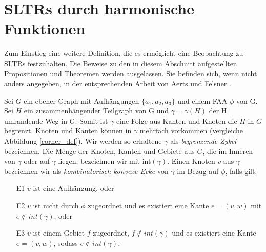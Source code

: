 \section{SLTRs durch harmonische Funktionen}\label{harmonic_approach}

Zum Einstieg eine weitere Definition, die es ermöglicht eine Beobachtung zu SLTRs festzuhalten. Die Beweise zu den in diesem Abschnitt aufgestellten Propositionen und Theoremen werden ausgelassen. Sie befinden sich, wenn nicht anders angegeben, in der entsprechenden Arbeit von Aerts und Felsner \cite{af13}.

\begin{definition}\label{def_ccc}
Sei $G$ ein ebener Graph mit Aufhängungen $\{a_1,a_2,a_3\}$ und einem FAA $\phi$ von G. Sei $H$ ein zusammenhängender Teilgraph von G und $\gamma=\gamma(H)$ der H umrandende Weg in G. Somit ist $\gamma$ eine Folge aus Kanten und Knoten die $H$ in $G$ begrenzt. Knoten und Kanten können in $\gamma$ mehrfach vorkommen (vergleiche Abbildung \ref{corner_def}). Wir werden so erhaltene $\gamma$ als \textit{begrenzende Zykel} bezeichnen. Die Menge der Knoten, Kanten und Gebiete aus $G$, die im Inneren von $\gamma$ oder auf $\gamma$ liegen, bezeichnen wir mit int$(\gamma)$. Einen Knoten $v$ aus $\gamma$ bezeichnen wir als \textit{kombinatorisch konvexe Ecke} von $\gamma$ im Bezug auf $\phi$, falls gilt:
\begin{itemize}
\item [E1] $v$ ist eine Aufhängung, oder
\item [E2] $v$ ist nicht durch $\phi$ zugeordnet und es existiert eine Kante $e = (v,w)$ mit $e \notin int(\gamma)$, oder
\item [E3] $v$ ist einem Gebiet $f$ zugeordnet, $f \notin int(\gamma)$ und es existiert eine Kante $e = (v,w)$, sodass $e \notin int(\gamma)$.
\end{itemize}
\end{definition}

